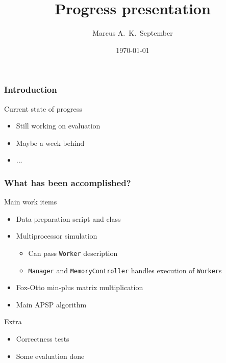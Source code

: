 \documentclass{beamer}
\title{Progress presentation}
\subtitle{\dissertationtitle}
\author{Marcus A.\ K.\ September}
\date{\today}
\begin{document}
\begin{frame}
    \titlepage
\end{frame}

\begin{frame}
    \frametitle{Introduction}
\end{frame}

\begin{frame}{Current state of progress}
    \begin{itemize}
        \item Still working on evaluation
        \item Maybe a week behind
        \item ...
    \end{itemize}
\end{frame}

\begin{frame}[t]
    \frametitle{What has been accomplished?}

    \begin{block}{Main work items}
        \begin{itemize}
            \item Data preparation script and class
            \item Multiprocessor simulation
                \begin{itemize}
                    \item Can pass \texttt{Worker} description
                    \item \texttt{Manager} and \texttt{MemoryController} handles
                        execution of \texttt{Worker}s
                \end{itemize}
            \item Fox-Otto min-plus matrix multiplication
            \item Main APSP algorithm
        \end{itemize}
    \end{block}

    \begin{block}{Extra}
        \begin{itemize}
            \item Correctness tests
            \item Some evaluation done
        \end{itemize}
    \end{block}


\end{frame}
\end{document}
